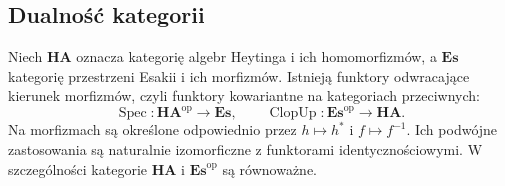\subsection{Dualność kategorii}

\begin{twierdzenie}
\label{thm:ncl-heyting-esakia-duality}
Niech $\mathbf{HA}$ oznacza kategorię algebr Heytinga
i ich homomorfizmów, a $\mathbf{Es}$ kategorię
przestrzeni Esakii i ich morfizmów.
Istnieją funktory odwracające kierunek morfizmów,
czyli funktory kowariantne na kategoriach przeciwnych:
\[
 \operatorname{Spec}:\mathbf{HA}^{\mathrm{op}}\to
 \mathbf{Es},\qquad
 \operatorname{ClopUp}:\mathbf{Es}^{\mathrm{op}}\to
 \mathbf{HA}.
\]
Na morfizmach są określone odpowiednio przez
$h\mapsto h^*$ i $f\mapsto f^{-1}$.
Ich podwójne zastosowania są naturalnie izomorficzne
z funktorami identycznościowymi.
W szczególności kategorie $\mathbf{HA}$ i
$\mathbf{Es}^{\mathrm{op}}$ są równoważne.
\end{twierdzenie}
